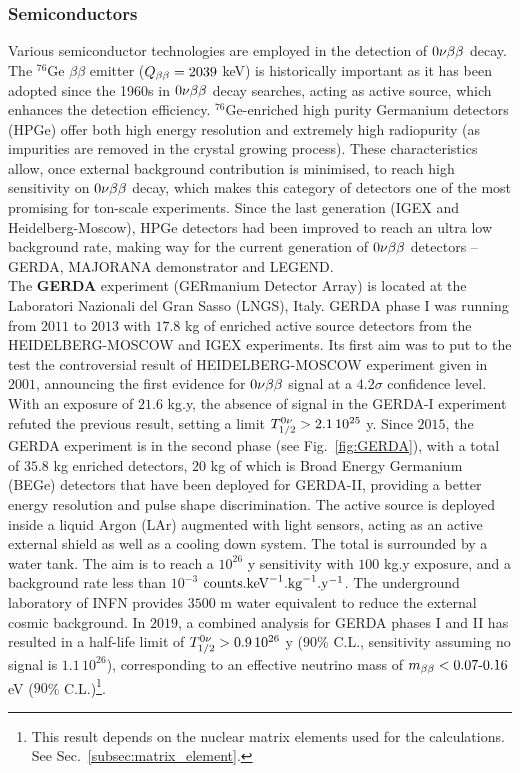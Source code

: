 \subsubsection{Semiconductors}
\label{subsec:semiconductors}
Various semiconductor technologies are employed in the detection of $0\nu\beta\beta$ decay.
The $^{76}$Ge $\beta\beta$ emitter ($Q_{\beta\beta}=2039$ keV) is historically important as it has been adopted since the 1960s in $0\nu\beta\beta$ decay searches, acting as active source, which enhances the detection efficiency.
$^{76}$Ge-enriched high purity Germanium detectors (HPGe) offer both high energy resolution and extremely high radiopurity (as impurities are removed in the crystal growing process).
These characteristics allow, once external background contribution is minimised, to reach high sensitivity on $0\nu\beta\beta$ decay, which makes this category of detectors one of the most promising for ton-scale experiments.
Since the last generation (IGEX and Heidelberg-Moscow), HPGe detectors had been improved to reach an ultra low background rate, making way for the current generation of $0\nu\beta\beta$ detectors -- GERDA, MAJORANA demonstrator and LEGEND.\\

The \textbf{GERDA} experiment (GERmanium Detector Array) is located at the Laboratori Nazionali del Gran Sasso (LNGS), Italy.
GERDA phase I was running from $2011$ to $2013$ with $17.8$ kg of enriched active source detectors from the HEIDELBERG-MOSCOW and IGEX experiments.
Its first aim was to put to the test the controversial result of HEIDELBERG-MOSCOW experiment given in $2001$, announcing the first evidence for $0\nu\beta\beta$ signal at a $4.2\sigma$ confidence level.
With an exposure of $21.6$ kg.y, the absence of signal in the GERDA-I experiment refuted the previous result, setting a limit $T_{1/2}^{0\nu}>2.1\, 10^{25}$ y.
Since $2015$, the GERDA experiment is in the second phase (see Fig.~\ref{fig:GERDA}), with a total of $35.8$ kg enriched detectors, $20$ kg of which is Broad Energy Germanium (BEGe) detectors that have been deployed for GERDA-II, providing a better energy resolution and pulse shape discrimination.
The active source is deployed inside a liquid Argon (LAr) augmented with light sensors, acting as an active external shield as well as a cooling down system.
The total is surrounded by a water tank.
The aim is to reach a $10^{26}$ y sensitivity with $100$ kg.y exposure, and a background rate less than $10^{-3}$ $\text{counts.keV}^{-1}\text{.kg}^{-1}\text{.y}^{-1}$.
The underground laboratory of INFN provides $3500$ m water equivalent to reduce the external cosmic background.
In $2019$, a combined analysis for GERDA phases I and II has resulted in a half-life limit of $T_{1/2}^{0\nu}>0.9\, 10^{26}$ y ($90$\% C.L., sensitivity assuming no signal is $1.1\, 10^{26}$), corresponding to an effective neutrino mass of $m_{\beta\beta}<0.07\text{-}0.16$ eV ($90$\% C.L.)\footnote{This result depends on the nuclear matrix elements used for the calculations. See Sec.~\ref{subsec:matrix_element}.}.


